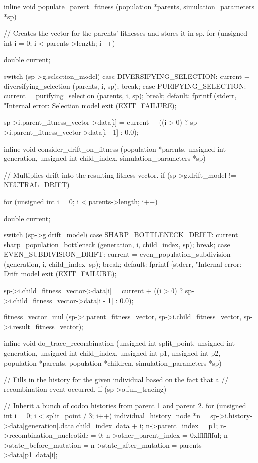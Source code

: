 \documentclass{article}
\begin{document}
\begin{ccode}
inline void populate_parent_fitness (population *parents, simulation_parameters *sp) {
  // Creates the vector for the parents' fitnesses and stores it in sp.
  for (unsigned int i = 0; i < parents->length; i++) {
    double current;

    switch (sp->g.selection_model) {
      case DIVERSIFYING_SELECTION:
	current = diversifying_selection (parents, i, sp);
	break;
      case PURIFYING_SELECTION:
	current = purifying_selection (parents, i, sp);
	break;
      default:
	fprintf (stderr, "Internal error: Selection model %
	exit (EXIT_FAILURE);
    }

    sp->i.parent_fitness_vector->data[i] = current +
      ((i > 0) ? sp->i.parent_fitness_vector->data[i - 1] : 0.0);
  }
}

inline void consider_drift_on_fitness (population *parents, unsigned int generation,
				       unsigned int child_index, simulation_parameters *sp) {
  // Multiplies drift into the resulting fitness vector.
  if (sp->g.drift_model != NEUTRAL_DRIFT) {
    for (unsigned int i = 0; i < parents->length; i++) {
      double current;

      switch (sp->g.drift_model) {
        case SHARP_BOTTLENECK_DRIFT:
	  current = sharp_population_bottleneck (generation, i, child_index, sp);
	  break;
        case EVEN_SUBDIVISION_DRIFT:
	  current = even_population_subdivision (generation, i, child_index, sp);
	  break;
        default:
	  fprintf (stderr, "Internal error: Drift model %
	  exit (EXIT_FAILURE);
      }

      sp->i.child_fitness_vector->data[i] = current +
        ((i > 0) ? sp->i.child_fitness_vector->data[i - 1] : 0.0);
    }

    fitness_vector_mul (sp->i.parent_fitness_vector, sp->i.child_fitness_vector,
			sp->i.result_fitness_vector);
  }
}

inline void do_trace_recombination (unsigned int split_point, unsigned int generation,
				    unsigned int child_index, unsigned int p1, unsigned int p2,
				    population *parents, population *children,
				    simulation_parameters *sp) {
  // Fills in the history for the given individual based on the fact that a
  // recombination event occurred.
  if (sp->o.full_tracing) {
    // Inherit a bunch of codon histories from parent 1 and parent 2.
    for (unsigned int i = 0; i < split_point / 3; i++) {
      individual_history_node *n =
        sp->i.history->data[generation].data[child_index].data + i;
      n->parent_index = p1;
      n->recombination_nucleotide = 0;
      n->other_parent_index = 0xfffffffful;
      n->state_before_mutation = n->state_after_mutation =
        parents->data[p1].data[i];
    }

}}
\end{ccode}
\end{document}
